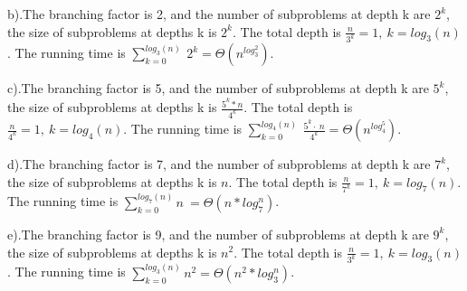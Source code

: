 \documentclass[11pt]{article}
\begin{document}
b).The branching factor is 2, and the number of subproblems at depth k are $2^k$, the size of subproblems at depths k is $2^k$. The total depth is $\frac{n}{3^k}=1, \  k=log_3(n)$. The running time is $\sum _{k=0}^{log_3\left(n\right)}\:2^k=\Theta (n^{log_3^2})$.

c).The branching factor is 5, and the number of subproblems at depth k are $5^k$, the size of subproblems at depths k is $\frac{5^k*n}{4^k}$. The total depth is $\frac{n}{4^k}=1, \  k=log_4(n)$. The running time is $\sum _{k=0}^{log_4\left(n\right)}\:\frac{5^k\cdot \:n}{4^k}=\Theta(n^{log_4^5})$.

d).The branching factor is 7, and the number of subproblems at depth k are $7^k$, the size of subproblems at depths k is $n$. The total depth is $\frac{n}{7^k}=1, \  k=log_7(n)$. The running time is $\sum _{k=0}^{log_7\left(n\right)}n\:=\Theta(n*log_7^n)$.

e).The branching factor is 9, and the number of subproblems at depth k are $9^k$, the size of subproblems at depths k is $n^2$. The total depth is $\frac{n}{3^k}=1, \  k=log_3(n)$. The running time is $\sum _{k=0}^{log_3\left(n\right)}n^2=\Theta(n^2*log_3^n)$.
\end{document}
